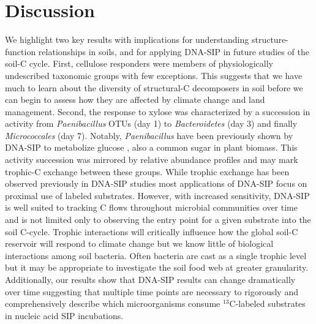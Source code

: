 \section{Discussion} 
We highlight two key results with implications for understanding structure-function
relationships in soils, and for applying DNA-SIP in future studies of the soil-C
cycle. First, cellulose responders were members of physiologically undescribed
taxonomic groups with few exceptions. This suggests that we have much to learn
about the diversity of structural-C decomposers in soil before we can begin to
assess how they are affected by climate change and land management. Second, the
response to xylose was characterized by a succession in activity from
\textit{Paenibacillus} OTUs (day 1) to \textit{Bacteroidetes} (day 3) and finally
\textit{Micrococcales} (day 7). Notably,  \textit{Paenibacillus} have been
previously shown by DNA-SIP to metabolize glucose \citep{Verastegui_2014}, also a common 
sugar in plant biomass. This activity succession was mirrored
by relative abundance profiles and may mark trophic-C exchange between these
groups. While trophic exchange has been observed previously in DNA-SIP studies
\citep{lueders2004b} most applications of DNA-SIP focus on proximal use of
labeled substrates. However, with increased sensitivity, DNA-SIP is well suited
to tracking C flows throughout microbial communities over time and is not
limited only to observing the entry point for a given substrate into the soil
C-cycle.  Trophic interactions will critically influence how the global soil-C
reservoir will respond to climate change \citep{Crowther2015} but we know
little of biological interactions among soil bacteria. Often bacteria are cast
as a single trophic level \citep{Moore1988} but it may be appropriate to
investigate the soil food web at greater granularity. Additionally, our results
show that DNA-SIP results can change dramatically over time suggesting that
multiple time points are necessary to rigorously and comprehensively describe
which microorganisms consume $^{13}$C-labeled substrates in nucleic acid SIP
incubations.

